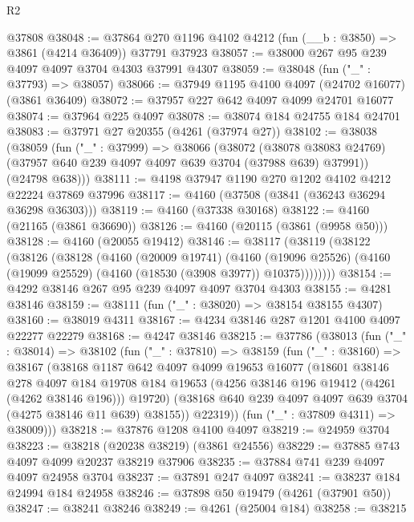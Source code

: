 \begin{lexlean}{R2}
\begin{coremodule}
    @37808
@38048 := @37864 @270 @1196 @4102 @4212 (fun (__b : @3850) => @3861 (@4214 @36409)) @37791 @37923
@38057 := @38000 @267 @95 @239 @4097 @4097 @3704 @4303 @37991 @4307
@38059 := @38048 (fun ("_" : @37793) => @38057)
@38066 := @37949 @1195 @4100 @4097 (@24702 @16077) (@3861 @36409)
@38072 := @37957 @227 @642 @4097 @4099 @24701 @16077
@38074 := @37964 @225 @4097
@38078 := @38074 @184 @24755 @184 @24701
@38083 := @37971 @27 @20355 (@4261 (@37974 @27))
@38102 := @38038
    (@38059
      (fun ("_" : @37999) =>
      @38066
        (@38072
          (@38078 @38083 @24769)
          (@37957 @640 @239 @4097 @4097 @639 @3704 (@37988 @639) @37991))
        (@24798 @638)))
@38111 := @4198 @37947 @1190 @270 @1202 @4102 @4212 @22224 @37869 @37996
@38117 := @4160 (@37508 (@3841 (@36243 @36294 @36298 @36303)))
@38119 := @4160 (@37338 @30168)
@38122 := @4160 (@21165 (@3861 @36690))
@38126 := @4160 (@20115 (@3861 (@9958 @50)))
@38128 := @4160 (@20055 @19412)
@38146 := @38117
    (@38119
      (@38122
        (@38126
          (@38128
            (@4160
              (@20009 @19741)
              (@4160
                (@19096 @25526)
                (@4160 (@19099 @25529) (@4160 (@18530 (@3908 @3977)) @10375))))))))
@38154 := @4292 @38146 @267 @95 @239 @4097 @4097 @3704 @4303
@38155 := @4281 @38146
@38159 := @38111 (fun ("_" : @38020) => @38154 @38155 @4307)
@38160 := @38019 @4311
@38167 := @4234 @38146 @287 @1201 @4100 @4097 @22277 @22279
@38168 := @4247 @38146
@38215 := @37786
    (@38013
      (fun ("_" : @38014) =>
      @38102
        (fun ("_" : @37810) =>
        @38159
          (fun ("_" : @38160) =>
          @38167
            (@38168
              @1187
              @642
              @4097
              @4099
              @19653
              @16077
              (@18601
                @38146
                @278
                @4097
                @184
                @19708
                @184
                @19653
                (@4256 @38146 @196 @19412 (@4261 (@4262 @38146 @196)))
                @19720)
              (@38168 @640 @239 @4097 @4097 @639 @3704 (@4275 @38146 @11 @639) @38155))
            @22319))
        (fun ("_" : @37809 @4311) => @38009)))
@38218 := @37876 @1208 @4100 @4097
@38219 := @24959 @3704
@38223 := @38218 (@20238 @38219) (@3861 @24556)
@38229 := @37885 @743 @4097 @4099 @20237 @38219 @37906
@38235 := @37884 @741 @239 @4097 @4097 @24958 @3704
@38237 := @37891 @247 @4097
@38241 := @38237 @184 @24994 @184 @24958
@38246 := @37898 @50 @19479 (@4261 (@37901 @50))
@38247 := @38241 @38246
@38249 := @4261 (@25004 @184)
@38258 := @38215

\end{coremodule}
\end{lexlean}

